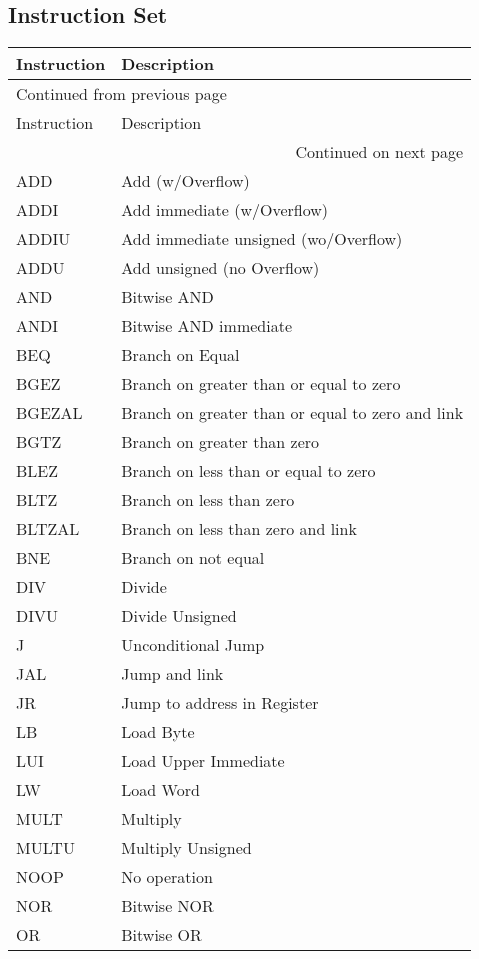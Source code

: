 \documentclass[11pt]{article}
\begin{document}
\subsection{Instruction Set}
\label{sec:org7fd2dd9}
\begin{longtable}{l|l}
Instruction & Description\\
\hline
\endfirsthead
\multicolumn{2}{l}{Continued from previous page} \\
\hline

Instruction & Description \\

\hline
\endhead
\hline\multicolumn{2}{r}{Continued on next page} \\
\endfoot
\endlastfoot
\hline
ADD & Add (w/Overflow)\\
ADDI & Add immediate (w/Overflow)\\
ADDIU & Add immediate unsigned (wo/Overflow)\\
ADDU & Add unsigned (no Overflow)\\
AND & Bitwise AND\\
ANDI & Bitwise AND immediate\\
BEQ & Branch on Equal\\
BGEZ & Branch on greater than or equal to zero\\
BGEZAL & Branch on greater than or equal to zero and link\\
BGTZ & Branch on greater than zero\\
BLEZ & Branch on less than or equal to zero\\
BLTZ & Branch on less than zero\\
BLTZAL & Branch on less than zero and link\\
BNE & Branch on not equal\\
DIV & Divide\\
DIVU & Divide Unsigned\\
J & Unconditional Jump\\
JAL & Jump and link\\
JR & Jump to address in Register\\
LB & Load Byte\\
LUI & Load Upper Immediate\\
LW & Load Word\\
MULT & Multiply\\
MULTU & Multiply Unsigned\\
NOOP & No operation\\
NOR & Bitwise NOR\\
OR & Bitwise OR\\

\end{longtable}
\end{document}
